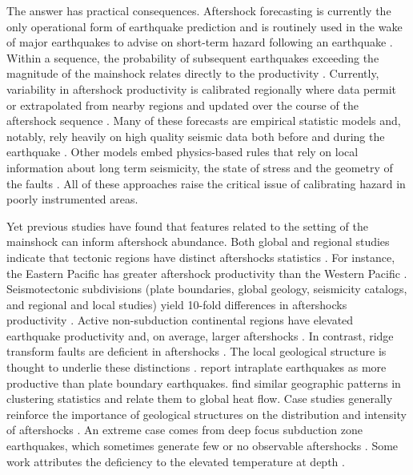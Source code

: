 \documentclass[draft, jgrga]{agujournal2018}
\begin{document}
The answer has practical consequences. Aftershock forecasting is currently the only operational form of earthquake prediction and is routinely used in the wake of major earthquakes to advise on short-term hazard following an earthquake \citep{Reasenberg1989, Page,Hardebeck2018UpdatedParameters}. Within a sequence, the probability of subsequent earthquakes exceeding the magnitude of the mainshock relates directly to the productivity \citep{Reasenberg1989, Reasenberg1999ForeshockEarthquakes}. Currently, variability in aftershock productivity is calibrated regionally where data permit or extrapolated from nearby regions and updated over the course of the aftershock sequence \citep[e.g.][]{Reasenberg1989, Reasenberg1999ForeshockEarthquakes, ogata2017statistics}. Many of these forecasts are empirical statistic models and, notably, rely heavily on high quality seismic data both before and during the earthquake \citep{Gerstenberger2005Real-timeCalifornia, Omi2015Intermediate-termApproaches}. Other models embed physics-based rules that rely on local information about long term seismicity, the state of stress and the geometry of the faults \citep[e.g.][]{Field2017AForecast}. All of these approaches raise the critical issue of calibrating hazard in poorly instrumented areas.

Yet previous studies have found that features related to the setting of the mainshock can inform aftershock abundance. Both global and regional studies indicate that tectonic regions have distinct aftershocks statistics \citep{Chu2011, Page, Davidsen2015GeneralizedCalifornia, Tahir2014Aftershock2005, ogata2017statistics}. For instance, the Eastern Pacific has greater aftershock productivity than the Western Pacific \citep{Singh1911, Wetzler2016}. Seismotectonic subdivisions (plate boundaries, global geology, seismicity catalogs, and regional and local studies) yield 10-fold differences in aftershocks productivity \citep{Page}. Active non-subduction continental regions have elevated earthquake productivity and, on average, larger aftershocks \citep{Page, Mogi1967, Davis1991Single-linkVariations}. In contrast, ridge transform faults are deficient in aftershocks \citep{Davis1991Single-linkVariations, Boettcher2004EarthquakeFaults, McGuire2005}. The local geological structure is thought to underlie these distinctions \citep{Boettcher2004EarthquakeFaults, McCloskey2003StructuralAftershocks}. \citet{Yamanaka1990scalingshock} report intraplate earthquakes as more productive than plate boundary earthquakes. \citet{Zaliapin2016AClusters} find similar geographic patterns in clustering statistics and relate them to global heat flow. Case studies generally reinforce the importance of geological structures on the distribution and intensity of aftershocks \citep{Das2003SpatialDistribution, McCloskey2003StructuralAftershocks}. An extreme case comes from deep focus subduction zone earthquakes, which sometimes generate few or no observable aftershocks \citep{Bath1965LateralMantle, Frohlich1989TheEarthquakes, Nyffenegger2000, Wiens1997AftershockZone, Wu1999, Houston2004}. Some work attributes the deficiency to the elevated temperature at depth \citep{Nyffenegger2000, Houston2004}.
\end{document}
